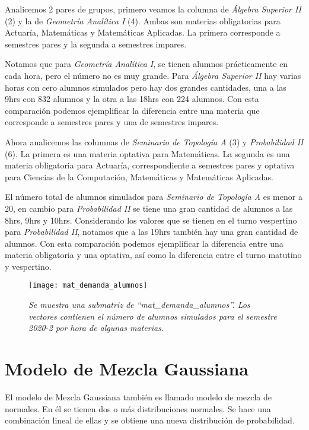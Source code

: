 Analicemos 2 pares de grupos, primero veamos la columna de \textit{Álgebra Superior II} (2) y la de \textit{Geometría Analítica I} (4). Ambas son materias obligatorias para Actuaría, Matemáticas y Matemáticas Aplicadas. La primera corresponde a semestres pares y la segunda a semestres impares.

Notamos que para \textit{Geometría Analítica I}, se tienen alumnos prácticamente en cada hora, pero el número no es muy grande. Para \textit{Álgebra Superior II} hay varias horas con cero alumnos simulados pero hay dos grandes cantidades, una a las 9hrs con 832 alumnos y la otra a las 18hrs con 224 alumnos. Con esta comparación podemos ejemplificar la diferencia entre una materia que corresponde a semestres pares y una de semestres impares.

Ahora analicemos las columnas de \textit{Seminario de Topología A} (3) y \textit{Probabilidad II} (6). La primera es una materia optativa para Matemáticas. La segunda es una materia obligatoria para Actuaría, correspondiente a semestres pares y optativa para Ciencias de la Computación, Matemáticas y Matemáticas Aplicadas.

El número total de alumnos simulados para \textit{Seminario de Topología A} es menor a 20, en cambio para \textit{Probabilidad II} se tiene una gran cantidad de alumnos a las 8hrs, 9hrs y 10hrs. Considerando los valores que se tienen en el turno vespertino para \textit{Probabilidad II}, notamos que a las 19hrs también hay una gran cantidad de alumnos. Con esta comparación podemos ejemplificar la diferencia entre una materia obligatoria y una optativa, así como la diferencia entre el turno matutino y vespertino.


\begin{figure}[H]
\centering
\texttt{[image: mat\_demanda\_alumnos]} %
\caption[\textit{Matriz con demanda simulada para el 2020-2}]{\textit{Se muestra una submatriz de ``mat\_demanda\_alumnos''. Los vectores contienen el número de alumnos simulados para el semestre 2020-2 por hora de algunas materias.}}\label{matDemandaAlum}
\end{figure}


\section{Modelo de Mezcla Gaussiana} \label{sec_GMM}

El modelo de Mezcla Gaussiana también es llamado modelo de mezcla de normales. En él se tienen dos o más distribuciones normales. Se hace una combinación lineal de ellas y se obtiene una nueva distribución de probabilidad.

